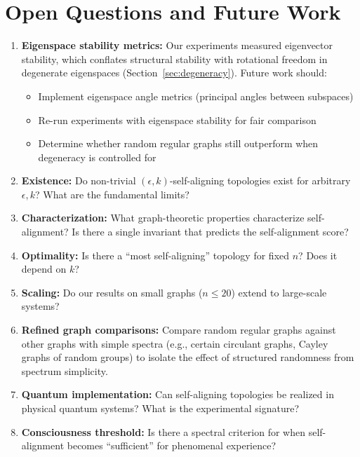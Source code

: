 \documentclass[11pt,a4paper]{article}
\theoremstyle{definition}
\theoremstyle{remark}
\begin{document}
\section{Open Questions and Future Work}

\begin{enumerate}
    \item \textbf{Eigenspace stability metrics:} Our experiments measured eigenvector stability, which conflates structural stability with rotational freedom in degenerate eigenspaces (Section~\ref{sec:degeneracy}). Future work should:
    \begin{itemize}
        \item Implement eigenspace angle metrics (principal angles between subspaces)
        \item Re-run experiments with eigenspace stability for fair comparison
        \item Determine whether random regular graphs still outperform when degeneracy is controlled for
    \end{itemize}
    
    \item \textbf{Existence:} Do non-trivial $(\epsilon, k)$-self-aligning topologies exist for arbitrary $\epsilon, k$? What are the fundamental limits?
    
    \item \textbf{Characterization:} What graph-theoretic properties characterize self-alignment? Is there a single invariant that predicts the self-alignment score?
    
    \item \textbf{Optimality:} Is there a ``most self-aligning'' topology for fixed $n$? Does it depend on $k$?
    
    \item \textbf{Scaling:} Do our results on small graphs ($n \leq 20$) extend to large-scale systems?
    
    \item \textbf{Refined graph comparisons:} Compare random regular graphs against other graphs with simple spectra (e.g., certain circulant graphs, Cayley graphs of random groups) to isolate the effect of structured randomness from spectrum simplicity.
    
    \item \textbf{Quantum implementation:} Can self-aligning topologies be realized in physical quantum systems? What is the experimental signature?
    
    \item \textbf{Consciousness threshold:} Is there a spectral criterion for when self-alignment becomes ``sufficient'' for phenomenal experience?
\end{enumerate}
\end{document}
